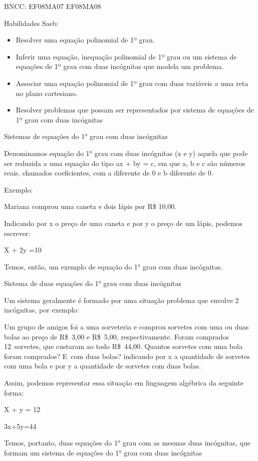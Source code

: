 BNCC: EF08MA07 EF08MA08

Habilidades Saeb:

\begin{itemize}
\item
  Resolver uma equação polinomial de 1º grau.
\item
  Inferir uma equação, inequação polinomial de 1º grau ou um sistema de
  equações de 1º grau com duas incógnitas que modela um problema.
\item
  Associar uma equação polinomial de 1º grau com duas variáveis a uma
  reta no plano cartesiano.
\item
  Resolver problemas que possam ser representados por sistema de
  equações de 1º grau com duas incógnitas
\end{itemize}

Sistemas de equações do 1° grau com duas incógnitas

Denominamos equação do 1° grau com duas incógnitas (x e y) aquela que
pode ser reduzida a uma equação do tipo ax + by = c, em que a, b e c são
números reais, chamados coeficientes, com a diferente de 0 e b diferente
de 0.

Exemplo:

Mariana comprou uma caneta e dois lápis por R\$ 10,00.

Indicando por x o preço de uma caneta e por y o preço de um lápis,
podemos escrever:

X + 2y =10

Temos, então, um exemplo de equação do 1° grau com duas incógnitas.

Sistema de duas equações do 1° grau com duas incógnitas

Um sistema geralmente é formado por uma situação problema que envolve 2
incógnitas, por exemplo:

Um grupo de amigos foi a uma sorveteria e comprou sorvetes com uma ou
duas bolas ao preço de R\$~3,00 e R\$~5,00, respectivamente. Foram
comprados 12~sorvetes, que custaram ao todo R\$~44,00. Quantos sorvetes
com uma bola foram comprados? E~com duas bolas? indicando por x a
quantidade de sorvetes com uma bola e por y a quantidade de sorvetes com
duas bolas.

Assim, podemos representar essa situação em linguagem algébrica da
seguinte forma:

X + y = 12

3x+5y=44

Temos, portanto, duas equações do 1° grau com as mesmas duas incógnitas,
que formam um sistema de equações do 1° grau com duas incógnitas

